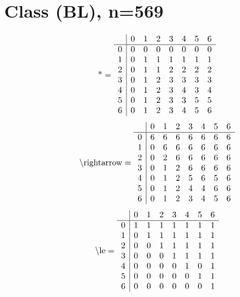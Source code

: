 \documentclass[11pt]{article}
\begin{document}
\section{Class (BL), n=569}
\[\text{*} = 
\begin{array}{r | r r r r r r r}
 & 0 & 1 & 2 & 3 & 4 & 5 & 6 \\ \hline
0 & 0 & 0 & 0 & 0 & 0 & 0 & 0 \\
1 & 0 & 1 & 1 & 1 & 1 & 1 & 1 \\
2 & 0 & 1 & 1 & 2 & 2 & 2 & 2 \\
3 & 0 & 1 & 2 & 3 & 3 & 3 & 3 \\
4 & 0 & 1 & 2 & 3 & 4 & 3 & 4 \\
5 & 0 & 1 & 2 & 3 & 3 & 5 & 5 \\
6 & 0 & 1 & 2 & 3 & 4 & 5 & 6 \\
\end{array}
\]
\[\text{\textbackslash rightarrow} = 
\begin{array}{r | r r r r r r r}
 & 0 & 1 & 2 & 3 & 4 & 5 & 6 \\ \hline
0 & 6 & 6 & 6 & 6 & 6 & 6 & 6 \\
1 & 0 & 6 & 6 & 6 & 6 & 6 & 6 \\
2 & 0 & 2 & 6 & 6 & 6 & 6 & 6 \\
3 & 0 & 1 & 2 & 6 & 6 & 6 & 6 \\
4 & 0 & 1 & 2 & 5 & 6 & 5 & 6 \\
5 & 0 & 1 & 2 & 4 & 4 & 6 & 6 \\
6 & 0 & 1 & 2 & 3 & 4 & 5 & 6 \\
\end{array}
\]
\[\text{\textbackslash le} = 
\begin{array}{r | r r r r r r r}
 & 0 & 1 & 2 & 3 & 4 & 5 & 6 \\ \hline
0 & 1 & 1 & 1 & 1 & 1 & 1 & 1 \\
1 & 0 & 1 & 1 & 1 & 1 & 1 & 1 \\
2 & 0 & 0 & 1 & 1 & 1 & 1 & 1 \\
3 & 0 & 0 & 0 & 1 & 1 & 1 & 1 \\
4 & 0 & 0 & 0 & 0 & 1 & 0 & 1 \\
5 & 0 & 0 & 0 & 0 & 0 & 1 & 1 \\
6 & 0 & 0 & 0 & 0 & 0 & 0 & 1 \\
\end{array}
\]
\end{document}
